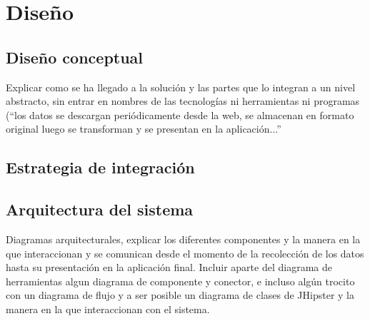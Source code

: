 \chapter{Diseño}  \label{disenyo}
\section{Diseño conceptual} \label{disenyo.conceptual}
Explicar como se ha llegado a la solución y las partes que lo integran a un nivel abstracto, sin entrar en nombres de las tecnologías ni herramientas ni programas (“los datos se descargan periódicamente desde la web, se almacenan en formato original luego se transforman y se presentan en la aplicación...”
\section{Estrategia de integración} \label{disenyo.estrategia}
\section{Arquitectura del sistema} \label{disenyo.arquitectura}
Diagramas arquitecturales, explicar los diferentes componentes y la manera en la que interaccionan y se comunican desde el momento de la recolección de los datos hasta su presentación en la aplicación final. Incluir aparte del diagrama de herramientas algun diagrama de componente y conector, e incluso algún trocito con un diagrama de flujo y a ser posible un diagrama de clases de JHipster y la manera en la que interaccionan con el sistema.
